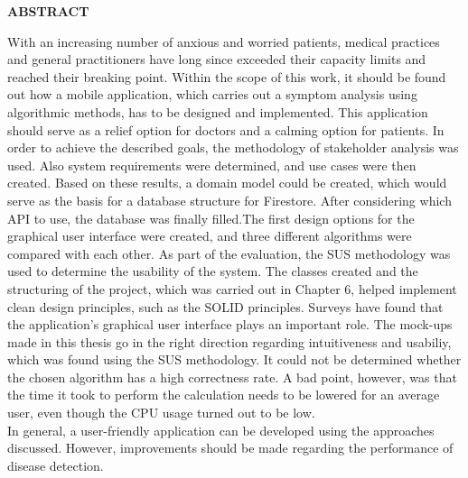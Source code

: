 

{
	\raggedbottom
	\centering
	\vspace{0.9cm}
	\large
	\textbf{ABSTRACT}
		\vspace*{\fill}
		
		With an increasing number of anxious and worried patients, medical practices and general practitioners have long since exceeded their capacity limits and reached their breaking point. Within the scope of this work, it should be found out how a mobile application, which carries out a symptom analysis using algorithmic methods, has to be designed and implemented. This application should serve as a relief option for doctors and a calming option for patients. In order to achieve the described goals, the methodology of stakeholder analysis was used. Also system requirements were determined, and use cases were then created. Based on these results, a domain model could be created, which would serve as the basis for a database structure for Firestore. After considering which API to use, the database was finally filled.The first design options for the graphical user interface were created, and three different algorithms were compared with each other. As part of the evaluation, the SUS methodology was used to determine the usability of the system. The classes created and the structuring of the project, which was carried out in Chapter 6, helped implement clean design principles, such as the SOLID principles. Surveys have found that the application's graphical user interface plays an important role. The mock-ups made in this thesis go in the right direction regarding intuitiveness and usabiliy, which was found using the SUS methodology. It could not be determined whether the chosen algorithm has a high correctness rate. A bad point, however, was that the time it took to perform the calculation needs to be lowered for an average user, even though the CPU usage turned out to be low.
		\newline \\
		In general, a user-friendly application can be developed using the approaches discussed. However, improvements should be made regarding the performance of disease detection.
	
	\vspace*{\fill}
	\pagebreak

}
